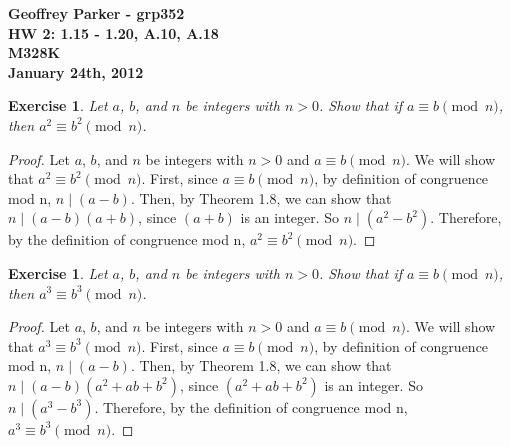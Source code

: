 \documentclass[12pt,leqno]{article}
\numberwithin{equation}{section}
\newtheorem{exer}[thm]{Exercise}
\theoremstyle{definition}
\begin{document}
\thispagestyle{plain}
\begin{flushright}
\large{\textbf{Geoffrey Parker - grp352 \\
HW 2: 1.15 - 1.20, A.10, A.18\\
M328K \\
January 24th, 2012 \\}}
\end{flushright}

\markboth{}{} \setcounter{section}{0} \baselineskip=18pt

\setcounter{tocdepth}{4}



\setcounter{section}{1}

\setcounter{thm}{14}

\begin{exer}
Let $a$, $b$, and $n$ be integers with $n
> 0$.  Show that if $a \equiv b \pmod{n}$,
then $a^2 \equiv b^2 \pmod{n}$.
\end{exer}

\begin{proof}[Proof]
Let $a$, $b$, and $n$ be integers with $n > 0$ and $a \equiv b \pmod{n}$. We will show that $a^2 \equiv b^2 \pmod{n}$.  First, since $a \equiv b \pmod{n}$, by definition of congruence mod n, $n \mid (a - b)$.  Then, by Theorem 1.8, we can show that $n \mid (a - b)(a + b)$, since $(a + b)$ is an integer.  So $n \mid (a^2 - b^2)$.  Therefore, by the definition of congruence mod n, $a^2 \equiv b^2 \pmod{n}$.
\end{proof}

\begin{exer}
Let $a$, $b$, and $n$ be integers with $n
> 0$.  Show that if $a \equiv b \pmod{n}$,
then $a^3 \equiv b^3 \pmod{n}$.
\end{exer}

\begin{proof}[Proof]
Let $a$, $b$, and $n$ be integers with $n > 0$ and $a \equiv b \pmod{n}$. We will show that $a^3 \equiv b^3 \pmod{n}$.  First, since $a \equiv b \pmod{n}$, by definition of congruence mod n, $n \mid (a - b)$.  Then, by Theorem 1.8, we can show that $n \mid (a - b)(a^2 + ab + b^2)$, since $(a^2 + ab + b^2)$ is an integer.  So $n \mid (a^3 - b^3)$.  Therefore, by the definition of congruence mod n, $a^3 \equiv b^3 \pmod{n}$.\end{proof}
\end{document}
